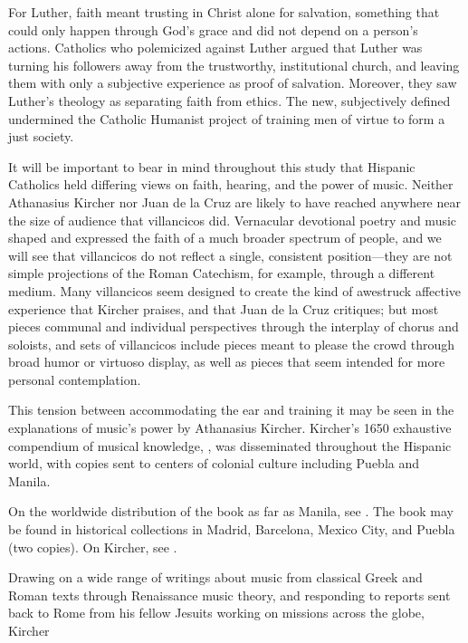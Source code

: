 For Luther, faith meant trusting in Christ alone for salvation, something that could only happen through God's grace and did not depend on a person's actions.
Catholics who polemicized against Luther argued that Luther was turning his followers away from the trustworthy, institutional church, and leaving them with only a subjective experience as proof of salvation.
Moreover, they saw Luther's theology as separating faith from ethics.
The new, subjectively defined  undermined the Catholic Humanist project of training men of virtue to form a just society.


It will be important to bear in mind throughout this study that Hispanic Catholics held differing views on faith, hearing, and the power of music.
Neither Athanasius Kircher nor Juan de la Cruz are likely to have reached anywhere near the size of audience that villancicos did.
Vernacular devotional poetry and music shaped and expressed the faith of a much broader spectrum of people, and we will see that villancicos do not reflect a single, consistent position---they are not simple projections of the Roman Catechism, for example, through a different medium.
Many villancicos seem designed to create the kind of awestruck affective experience that Kircher praises, and that Juan de la Cruz critiques; but most pieces communal and individual perspectives through the interplay of chorus and soloists, and sets of villancicos include pieces meant to please the crowd through broad humor or virtuoso display, as well as pieces that seem intended for more personal contemplation.

This tension between accommodating the ear and training it may be seen in the explanations of music's power by Athanasius Kircher.
Kircher's 1650 exhaustive compendium of musical knowledge, , was disseminated throughout the Hispanic world, with copies sent to centers of colonial culture including Puebla and Manila.%
\begin{Footnote}
  On the worldwide distribution of the book as far as Manila, see \autocite[\XXX]{Irving:Colonial}.
  The book may be found in historical collections in Madrid, Barcelona, Mexico City, and Puebla (two copies).
  On Kircher, see \XXX[cites].
\end{Footnote}


Drawing on a wide range of writings about music from classical Greek and Roman texts through Renaissance music theory, and responding to reports sent back to Rome from his fellow Jesuits working on missions across the globe, Kircher 


